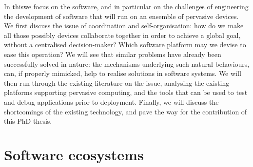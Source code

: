 \documentclass[12pt,a4paper,twoside,openright]{book}
\begin{document}
%
In this\levelText{}we focus on the software, and in particular on the challenges of engineering the development of software that will run on an ensemble of pervasive devices.
%
We first discuss the issue of coordination and self-organisation: how do we make all those possibly devices collaborate together in order to achieve a global goal, without a centralised decision-maker?
%
Which software platform may we devise to ease this operation?
%
We will see that similar problems have already been successfully solved in nature: the mechanisms underlying such natural behaviours, can, if properly mimicked, help to realise solutions in software systems.
%
We will then run through the existing literature on the issue, analysing the existing platforms supporting pervasive computing, and the tools that can be used to test and debug applications prior to deployment.
%
Finally, we will discuss the shortcomings of the existing technology, and pave the way for the contribution of this PhD thesis.

\section{Software ecosystems}
\end{document}
